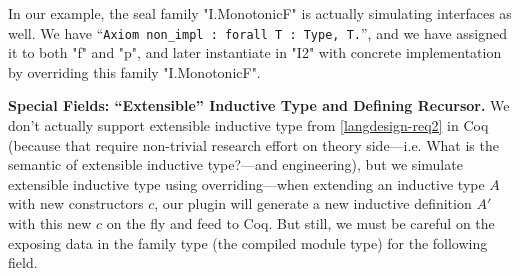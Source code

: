 In our example, the seal family "I.MonotonicF" is actually simulating
interfaces as well.  We have
\mbox{``\texttt{Axiom non_impl : forall {T : Type}, T.}''},
and we have assigned it to both "f" and "p", and later instantiate in
"I2" with concrete implementation by overriding this family
"I.MonotonicF".



\textbf{Special Fields: ``Extensible'' Inductive Type and Defining Recursor.}
We don't actually support extensible inductive type from \ref{langdesign-req2} in Coq (because that require non-trivial research effort on theory side---i.e. {What is the semantic of extensible inductive type?}---and engineering), but we simulate extensible inductive type using overriding---when extending an inductive type $A$ with new constructors $c$, our plugin will generate a new inductive definition $A'$ with this new $c$ on the fly and feed to Coq.  But still, we must be careful on the exposing data in the family type (the compiled module type) for the following field.  

